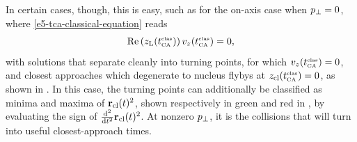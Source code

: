 In certain cases, though, this is easy, such as for the on-axis case when ${p_{\perp}}=0$, where \eqref{e5-tca-classical-equation} reads
\begin{equation}
\Re\left({z_\mathrm{L}}({t_{\scriptscriptstyle\mathrm{CA}}^{\scriptscriptstyle \mathrm{clas}}})\right)v_z({t_{\scriptscriptstyle\mathrm{CA}}^{\scriptscriptstyle \mathrm{clas}}})=0
,
\label{e5-tca-classical-equation-on-axis}
\end{equation}
with solutions that separate cleanly into turning points, for which $v_z({t_{\scriptscriptstyle\mathrm{CA}}^{\scriptscriptstyle \mathrm{clas}}})=0$, and closest approaches which degenerate to nucleus flybys at $z_{\mathrm{cl}}({t_{\scriptscriptstyle\mathrm{CA}}^{\scriptscriptstyle \mathrm{clas}}})=0$, as shown in . In this case, the turning points can additionally be classified as minima and maxima of $\vb{r}_{\mathrm{cl}}(t)^2$, shown respectively in green and red in , by evaluating the sign of $\tfrac{\mathrm{d}^2}{\mathrm{d} t^2}\vb{r}_{\mathrm{cl}}(t)^2$. At nonzero ${p_{\perp}}$, it is the collisions that will turn into useful closest-approach times.



